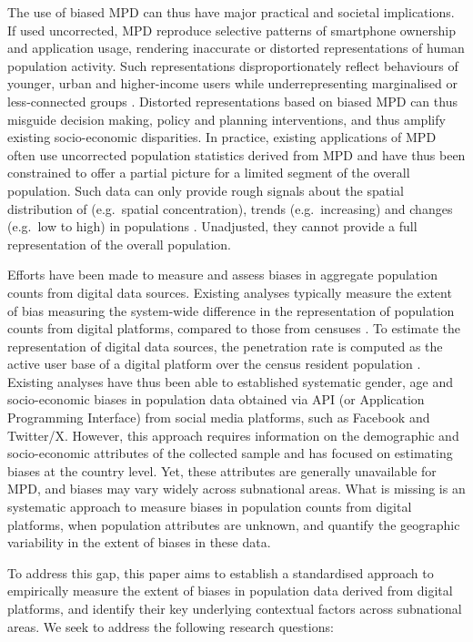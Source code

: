 \documentclass[]{rsos}%
\begin{document}
The use of biased MPD can thus have major practical and societal
implications. If used uncorrected, MPD reproduce selective patterns of
smartphone ownership and application usage, rendering inaccurate or
distorted representations of human population activity. Such
representations disproportionately reflect behaviours of younger, urban
and higher-income users while underrepresenting marginalised or
less-connected groups \citep{porter2012, wesolowski13-biases}. Distorted
representations based on biased MPD can thus misguide decision making,
policy and planning interventions, and thus amplify existing
socio-economic disparities. In practice, existing applications of MPD
often use uncorrected population statistics derived from MPD and have
thus been constrained to offer a partial picture for a limited segment
of the overall population. Such data can only provide rough
signals about the spatial distribution of (e.g.~spatial concentration),
trends (e.g.~increasing) and changes (e.g.~low to high) in populations
\citep{rowe22-sensing-ukraine}. Unadjusted, they cannot provide a full
representation of the overall population.

Efforts have been made to measure and assess biases in aggregate
population counts from digital data sources. Existing analyses typically
measure the extent of bias measuring the system-wide difference in the
representation of population counts from digital platforms, compared to those from censuses
\citep{ribeiro20-facebook, zagheni2015, gil-clavel2019}. To estimate the
representation of digital data sources, the penetration rate is computed
as the active user base of a digital platform over the census resident
population \citep{ribeiro20-facebook, gil-clavel2019}. Existing analyses
have thus been able to established systematic gender, age and
socio-economic biases in population data obtained via API (or
Application Programming Interface) from social media platforms, such as
Facebook and Twitter/X. However, this approach requires information on
the demographic and socio-economic attributes of the collected sample
and has focused on estimating biases at the country level. Yet, these
attributes are generally unavailable for MPD, and biases may vary widely
across subnational areas. What is missing is an systematic approach to
measure biases in population counts from digital platforms, when
population attributes are unknown, and quantify the geographic
variability in the extent of biases in these data.

To address this gap, this paper aims to establish a standardised
approach to empirically measure the extent of biases in population data
derived from digital platforms, and identify their key underlying
contextual factors across subnational areas. We seek to address the
following research questions:
\end{document}
